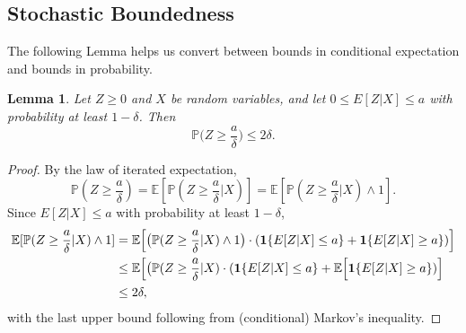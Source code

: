 \documentclass{article}
\newcommand{\1}{\mathbf{1}}
\newcommand{\Pbb}{\mathbb{P}}
\newcommand{\Ebb}{\mathbb{E}}
\theoremstyle{alden}
\theoremstyle{aldenthm}
\newtheorem{lemma}{Lemma}
\theoremstyle{definition}
\theoremstyle{remark}
\begin{document}
\subsection{Stochastic Boundedness}
The following Lemma helps us convert between bounds in conditional expectation and bounds in probability.
\begin{lemma}
	\label{lem:stochastic_boundedness}
	Let $Z \geq 0$ and $X$ be random variables, and let $0 \leq E[Z|X] \leq a$ with probability at least $1 - \delta$. Then
	\begin{equation*}
	\Pbb\biggl(Z \geq \frac{a}{\delta}\biggr) \leq 2\delta.
	\end{equation*}
\end{lemma}
\begin{proof}
	By the law of iterated expectation, 
	\begin{equation*}
	\Pbb(Z \geq \frac{a}{\delta}) = \Ebb[\Pbb(Z \geq \frac{a}{\delta}|X)] = \Ebb[\Pbb(Z \geq \frac{a}{\delta}|X) \wedge 1].
	\end{equation*}
	Since $E[Z|X] \leq a$ with probability at least $1 - \delta$,
	\begin{align*}
	\Ebb[\Pbb(Z \geq \frac{a}{\delta}|X) \wedge 1] & = \Ebb\Bigl[\bigl(\Pbb(Z \geq \frac{a}{\delta}|X) \wedge 1\bigr) \cdot (\1\{E[Z|X] \leq a\} + \1\{E[Z|X] \geq a\})\Bigr] \\
	& \leq \Ebb\Bigl[\bigl(\Pbb(Z \geq \frac{a}{\delta}|X) \cdot (\1\{E[Z|X] \leq a\} + \Ebb\Bigl[\1\{E[Z|X] \geq a\})\Bigr] \\
	& \leq 2\delta,
	\end{align*}
	with the last upper bound following from (conditional) Markov's inequality.
\end{proof}
\end{document}
